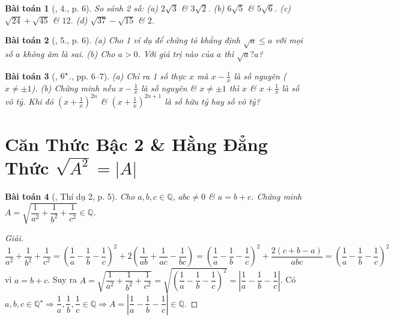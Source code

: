 \documentclass{article}
\newtheorem{baitoan}{Bài toán}
\begin{document}
\begin{baitoan}[\cite{Binh_Toan_9_tap_1}, 4., p. 6]
	So sánh 2 số: (a) $2\sqrt{3}$ \& $3\sqrt{2}$. (b) $6\sqrt{5}$ \& $5\sqrt{6}$. (c) $\sqrt{24} + \sqrt{45}$ \& $12$. (d) $\sqrt{37} - \sqrt{15}$ \& $2$.
\end{baitoan}

\begin{baitoan}[\cite{Binh_Toan_9_tap_1}, 5., p. 6]
	(a) Cho 1 ví dụ để chứng tỏ khẳng định $\sqrt{a}\le a$ với mọi số $a$ không âm là sai. (b) Cho $a > 0$. Với giá trị nào của $a$ thì $\sqrt{a} ? a$?
\end{baitoan}

\begin{baitoan}[\cite{Binh_Toan_9_tap_1}, $\rm6^\star$., pp. 6--7]
	(a) Chỉ ra 1 số thực $x$ mà $x - \frac{1}{x}$ là số nguyên ($x\ne\pm1$). (b) Chứng minh nếu $x - \frac{1}{x}$ là số nguyên \& $x\ne\pm1$ thì $x$ \& $x + \frac{1}{x}$ là số vô tỷ. Khi đó $\left(x + \frac{1}{x}\right)^{2n}$ \& $\left(x + \frac{1}{x}\right)^{2n+1}$ là số hữu tỷ hay số vô tỷ?
\end{baitoan}


\section{Căn Thức Bậc 2 \& Hằng Đẳng Thức $\sqrt{A^2} = |A|$}

\begin{baitoan}[\cite{Tuyen_Toan_9}, Thí dụ 2, p. 5]
	\label{prob: Tuyen_Toan_9 VD 2 p. 5}
	Cho $a,b,c\in\mathbb{Q}$, $abc\ne0$ \& $a = b + c$. Chứng minh $A = \sqrt{\dfrac{1}{a^2} + \dfrac{1}{b^2} + \dfrac{1}{c^2}}\in\mathbb{Q}$.
\end{baitoan}

\begin{proof}[Giải]
	$\dfrac{1}{a^2} + \dfrac{1}{b^2} + \dfrac{1}{c^2} = \left(\dfrac{1}{a} - \dfrac{1}{b} - \dfrac{1}{c}\right)^2 + 2\left(\dfrac{1}{ab} + \dfrac{1}{ac} - \dfrac{1}{bc}\right) = \left(\dfrac{1}{a} - \dfrac{1}{b} - \dfrac{1}{c}\right)^2 + \dfrac{2(c + b - a)}{abc} = \left(\dfrac{1}{a} - \dfrac{1}{b} - \dfrac{1}{c}\right)^2$ vì $a = b + c$. Suy ra $A = \sqrt{\dfrac{1}{a^2} + \dfrac{1}{b^2} + \dfrac{1}{c^2}} = \sqrt{\left(\dfrac{1}{a} - \dfrac{1}{b} - \dfrac{1}{c}\right)^2} = \left|\dfrac{1}{a} - \dfrac{1}{b} - \dfrac{1}{c}\right|$. Có $a,b,c\in\mathbb{Q}^\star\Rightarrow\dfrac{1}{a},\dfrac{1}{b},\dfrac{1}{c}\in\mathbb{Q}\Rightarrow A = \left|\dfrac{1}{a} - \dfrac{1}{b} - \dfrac{1}{c}\right|\in\mathbb{Q}$.
\end{proof}
\end{document}
